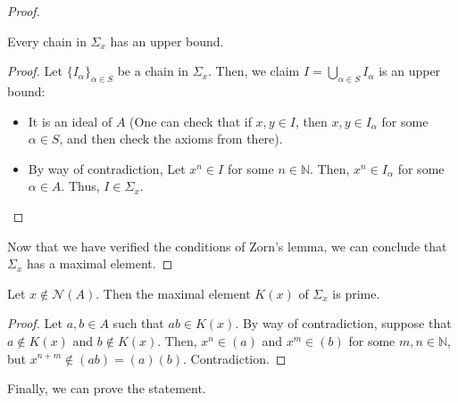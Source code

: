 \begin{problem}
\begin{enumerate}[label=(\theproblem.\arabic*),ref=\theproblem.\arabic*]
\begin{sol}
\begin{claim}
\begin{proof}
                        \begin{claim}
                            Every chain in $\varSigma_x$ has an upper bound.
                            \begin{proof}
                                Let $\{I_{\alpha}\}_{\alpha \in S}$ be a chain in $\varSigma_x$.
                                Then, we claim $I = \bigcup_{\alpha \in S} I_{\alpha}$ is an upper bound:
                                \begin{itemize}
                                    \item It is an ideal of $A$ (One can check that if $x,y \in I$, then $x,y \in I_{\alpha} $ for some $\alpha \in S$, and then check the axioms from there).

                                    \item By way of contradiction, Let $x^n \in I$ for some $n \in \mathbb{N}$.
                                Then, $x^n \in I_{\alpha}$ for some $\alpha \in A$.
                                Thus, $I \in \varSigma_x$.
                                \end{itemize}

                            \end{proof}
                        \end{claim}

                        Now that we have verified the conditions of Zorn's lemma, we can conclude that $\varSigma_x$ has a maximal element.
                    \end{proof}
                \end{claim}

                \begin{claim}
                    Let $x \notin \mathcal{N}(A)$.
                    Then the maximal element $K(x)$ of $\varSigma_x$ is prime.
                    \begin{proof}
                        Let $a,b \in A$ such that $ab \in K(x)$.
                        By way of contradiction, suppose that $a \notin K(x)$ and $b \notin K(x)$.
                        Then, $x^n \in (a)$ and $x^m \in (b)$ for some $m,n \in \mathbb{N}$, but $x^{n+m} \notin (ab) = (a)(b)$.
                        Contradiction.
                    \end{proof}
                \end{claim}

                Finally, we can prove the statement.


\end{sol}
\end{enumerate}
\end{problem}
